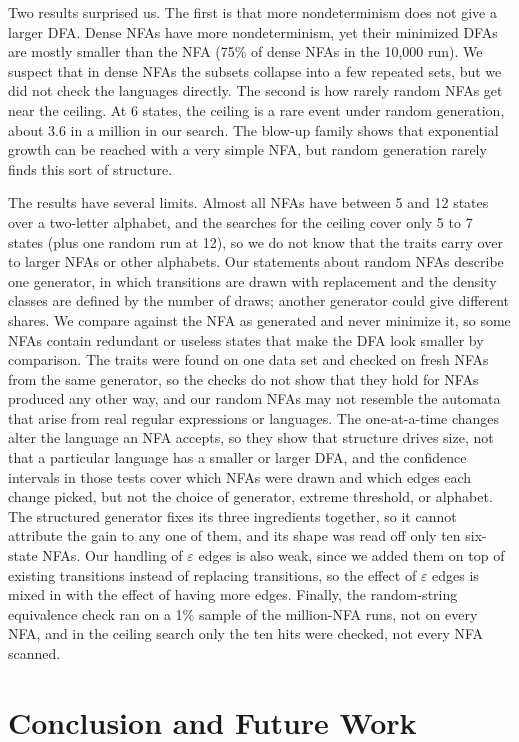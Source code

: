 \documentclass[9pt]{ieeeconf}
\begin{document}
Two results surprised us. The first is that more nondeterminism does not give a larger DFA. Dense NFAs have more nondeterminism, yet their minimized DFAs are mostly smaller than the NFA (75\% of dense NFAs in the 10,000 run). We suspect that in dense NFAs the subsets collapse into a few repeated sets, but we did not check the languages directly. The second is how rarely random NFAs get near the ceiling. At 6 states, the ceiling is a rare event under random generation, about 3.6 in a million in our search. The blow-up family shows that exponential growth can be reached with a very simple NFA, but random generation rarely finds this sort of structure.

The results have several limits. Almost all NFAs have between 5 and 12 states over a two-letter alphabet, and the searches for the ceiling cover only 5 to 7 states (plus one random run at 12), so we do not know that the traits carry over to larger NFAs or other alphabets. Our statements about random NFAs describe one generator, in which transitions are drawn with replacement and the density classes are defined by the number of draws; another generator could give different shares. We compare against the NFA as generated and never minimize it, so some NFAs contain redundant or useless states that make the DFA look smaller by comparison. The traits were found on one data set and checked on fresh NFAs from the same generator, so the checks do not show that they hold for NFAs produced any other way, and our random NFAs may not resemble the automata that arise from real regular expressions or languages. The one-at-a-time changes alter the language an NFA accepts, so they show that structure drives size, not that a particular language has a smaller or larger DFA, and the confidence intervals in those tests cover which NFAs were drawn and which edges each change picked, but not the choice of generator, extreme threshold, or alphabet. The structured generator fixes its three ingredients together, so it cannot attribute the gain to any one of them, and its shape was read off only ten six-state NFAs. Our handling of $\varepsilon$ edges is also weak, since we added them on top of existing transitions instead of replacing transitions, so the effect of $\varepsilon$ edges is mixed in with the effect of having more edges. Finally, the random-string equivalence check ran on a 1\% sample of the million-NFA runs, not on every NFA, and in the ceiling search only the ten hits were checked, not every NFA scanned. 

\section{Conclusion and Future Work}
\label{sec:conclusion}
\end{document}
